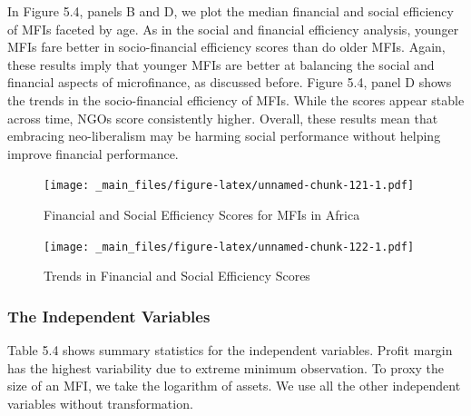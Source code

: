 \documentclass[a4paper, nobind]{templates/ociamthesis}
\begin{document}
In Figure 5.4, panels B and D, we plot the median financial and social efficiency of MFIs faceted by age. As in the social and financial efficiency analysis, younger MFIs fare better in socio-financial efficiency scores than do older MFIs. Again, these results imply that younger MFIs are better at balancing the social and financial aspects of microfinance, as discussed before. Figure 5.4, panel D shows the trends in the socio-financial efficiency of MFIs. While the scores appear stable across time, NGOs score consistently higher. Overall, these results mean that embracing neo-liberalism may be harming social performance without helping improve financial performance.

\begin{landscape}

\newpage

\begin{figure}
\centering
\texttt{[image: \_main\_files/figure-latex/unnamed-chunk-121-1.pdf]}
\caption{\label{fig:unnamed-chunk-121}Financial and Social Efficiency Scores for MFIs in Africa}
\end{figure}

\end{landscape}

\newpage

\begin{landscape}

\begin{figure}
\centering
\texttt{[image: \_main\_files/figure-latex/unnamed-chunk-122-1.pdf]}
\caption{\label{fig:unnamed-chunk-122}Trends in Financial and Social Efficiency Scores}
\end{figure}

\end{landscape}

\hypertarget{the-independent-variables}{%
\subsubsection{The Independent Variables}\label{the-independent-variables}}

Table 5.4 shows summary statistics for the independent variables. Profit margin has the highest variability due to extreme minimum observation. To proxy the size of an MFI, we take the logarithm of assets. We use all the other independent variables without transformation.
\end{document}
